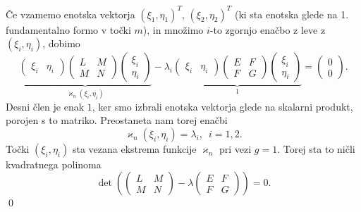     Če vzamemo enotska vektorja $(\xi_1, \eta_1)^{T}$, $(\xi_2, \eta_2)^{T}$ (ki sta enotska glede na 1. fundamentalno formo v točki $m$), in množimo $i$-to zgornjo enačbo z leve z $(\xi_i, \eta_i)$, 
    dobimo 
    \begin{equation*}
        \underbrace{\begin{pmatrix}
            \xi_i & \eta_i
        \end{pmatrix}
            \begin{pmatrix}
          L & M \\
          M & N
          \end{pmatrix}\begin{pmatrix}
            \xi_i \\
            \eta_i
        \end{pmatrix}}_{\varkappa_n(\xi_i, \eta_i)}    - \lambda_i 
        \underbrace{\begin{pmatrix}
            \xi_i & \eta_i
        \end{pmatrix}
        \begin{pmatrix}
        E & F \\
        F & G
        \end{pmatrix} \begin{pmatrix}
            \xi_i \\
            \eta_i
        \end{pmatrix}}_1  =  \begin{pmatrix}
            0 \\
            0
        \end{pmatrix}.
     \end{equation*}
     Desni člen je enak $1$, ker smo izbrali enotska vektorja glede na skalarni produkt, porojen s to matriko. Preostaneta nam torej enačbi \begin{equation*}
       \varkappa_n(\xi_i, \eta_i) = \lambda_i, \,\,\, i = 1,2.
     \end{equation*}  
     Točki $(\xi_i, \eta_i)$ sta vezana ekstrema funkcije $\varkappa_n$ pri vezi $g = 1$. Torej sta to ničli kvadratnega polinoma
     \begin{equation*}
        \det \left( 
         \begin{pmatrix}
       L & M \\
       M & N
       \end{pmatrix}  - \lambda \begin{pmatrix}
     E & F \\
     F & G
     \end{pmatrix} \right) = 0.
      \end{equation*} 
\qed

